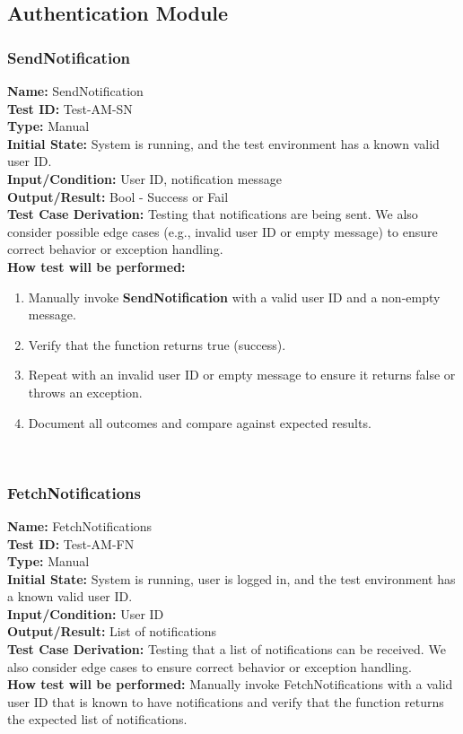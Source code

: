 \documentclass[12pt, titlepage]{article}
\begin{document}
\subsection{Authentication Module}

\subsubsection{SendNotification}

\textbf{Name:} SendNotification \label{itm:Test-AM-SN} \\
\textbf{Test ID:} Test-AM-SN \\
\textbf{Type:} Manual \\
\textbf{Initial State:} System is running, and the test environment has a known valid user ID. \\
\textbf{Input/Condition:} User ID, notification message \\
\textbf{Output/Result:}  Bool - Success or Fail \\
\textbf{Test Case Derivation:} Testing that notifications are being sent. We also consider possible edge cases (e.g., invalid user ID or empty message) to ensure correct behavior or exception handling.\\
\textbf{How test will be performed:}
\begin{enumerate}
    \item Manually invoke \textbf{SendNotification} with a valid user ID and a non-empty message.
    \item Verify that the function returns true (success).
    \item Repeat with an invalid user ID or empty message to ensure it returns false or throws an exception. 
    \item Document all outcomes and compare against expected results.
\end{enumerate}\\

\subsubsection{FetchNotifications}
\noindent
\textbf{Name:} FetchNotifications \label{itm:Test-AM-FN} \\
\textbf{Test ID:} Test-AM-FN \\
\textbf{Type:} Manual \\
\textbf{Initial State:} System is running, user is logged in, and the test environment has a known valid user ID. \\
\textbf{Input/Condition:} User ID \\
\textbf{Output/Result:} List of notifications \\
\textbf{Test Case Derivation:} Testing that a list of notifications can be received. We also consider edge cases to ensure correct behavior or exception handling.\\
\textbf{How test will be performed:} Manually invoke FetchNotifications with a valid user ID that is known to have notifications and verify that the function returns the expected list of notifications.
\end{document}
